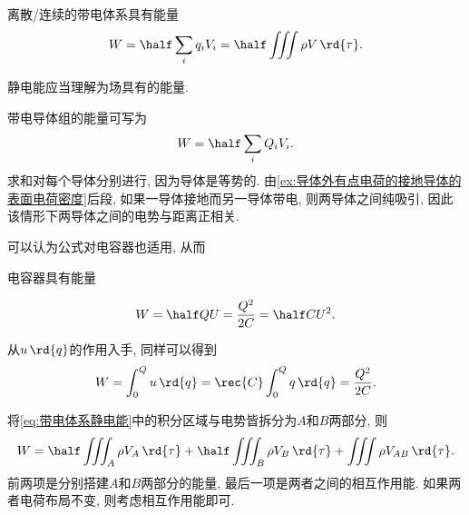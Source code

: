 \documentclass[../Electromagnetism.tex]{subfiles}
\begin{document}
\begin{finale}
	\begin{corollary}[带电体系静电能]
		离散/连续的带电体系具有能量
		\begin{equation}
			\label{eq:带电体系静电能}
			W = \half \sum_i q_i V_i = \half \iiint \rho V\,\rd{\tau}.
		\end{equation}
	\end{corollary}
\end{finale}
\begin{remark}
	静电能应当理解为场具有的能量.
\end{remark}
\begin{ex}
	带电导体组的能量可写为
	\[ W = \half \sum_i Q_i V_i. \]
	求和对每个导体分别进行, 因为导体是等势的. 由\cref{ex:导体外有点电荷的接地导体的表面电荷密度}后段, 如果一导体接地而另一导体带电, 则两导体之间纯吸引, 因此该情形下两导体之间的电势与距离正相关.
\end{ex}
可以认为公式对电容器也适用, 从而
\begin{corollary}[电容器的能量]
	电容器具有能量
	\begin{finale}
		\begin{equation}
			\label{eq:电容器场能}
			W = \half QU = \frac{Q^2}{2C} = \half CU^2.
		\end{equation}
	\end{finale}
\end{corollary}
\begin{remark}
	从$u\,\rd{q}$的作用入手, 同样可以得到
	\begin{equation}
		\label{eq:电容器场能的历史推导}
		W = \int_0^Q u\,\rd{q} = \rec{C}\int_0^Q q\,\rd{q} = \frac{Q^2}{2C}.
	\end{equation}
\end{remark}
\begin{remark}
	将\eqref{eq:带电体系静电能}中的积分区域与电势皆拆分为$A$和$B$两部分, 则
	\[ W = \half \iiint_A \rho V_A \,\rd{\tau} + \half \iiint_B \rho V_B \,\rd{\tau} + \iiint \rho V_{AB} \,\rd{\tau}. \]
	前两项是分别搭建$A$和$B$两部分的能量, 最后一项是两者之间的相互作用能. 如果两者电荷布局不变, 则考虑相互作用能即可.
\end{remark}



\end{document}

